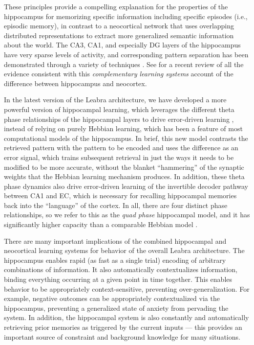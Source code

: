 \documentclass[11pt,twoside]{article}
\begin{document}
These principles provide a compelling explanation for the properties of the hippocampus for memorizing specific information including specific episodes (i.e., episodic memory), in contrast to a neocortical network that uses overlapping distributed representations to extract more generalized semantic information about the world.  The CA3, CA1, and especially DG layers of the hippocampus have very sparse levels of activity, and corresponding pattern separation has been demonstrated through a variety of techniques \cite{GilbertKesnerLee01,LeutgebLeutgebMoserEtAl07,McHughJonesQuinnEtAl07,BakkerKirwanMillerEtAl08}.  See  for a recent review of all the evidence consistent with this {\em complementary learning systems} account of the difference between hippocampus and neocortex.

In the latest version of the Leabra architecture, we have developed a more powerful version of hippocampal learning, which leverages the different theta phase relationships of the hippocampal layers to drive error-driven learning \cite{KetzEtAlInPrep}, instead of relying on purely Hebbian learning, which has been a feature of most computational models of the hippocampus.  In brief, this new model contrasts the retrieved pattern with the pattern to be encoded and uses the difference as an error signal, which trains subsequent retrieval in just the ways it needs to be modified to be more accurate, without the blanket ``hammering'' of the synaptic weights that the Hebbian learning mechanism produces.  In addition, these theta phase dynamics also drive error-driven learning of the invertible decoder pathway between CA1 and EC, which is necessary for recalling hippocampal memories back into the ``language'' of the cortex.  In all, there are four distinct phase relationships, so we refer to this as the {\em quad phase} hippocampal model, and it has significantly higher capacity than a comparable Hebbian model \cite{KetzEtAlInPrep}.

There are many important implications of the combined hippocampal and neocortical learning systems for behavior of the overall Leabra architecture.  The hippocampus enables rapid (as fast as a single trial) encoding of arbitrary combinations of information.  It also automatically contextualizes information, binding everything occurring at a given point in time together.  This enables behavior to be appropriately context-sensitive, preventing over-generalization.  For example, negative outcomes can be appropriately contextualized via the hippocampus, preventing a generalized state of anxiety from pervading the system.  
In addition, the hippocampal system is also constantly and automatically retrieving prior memories as triggered by the current inputs --- this provides an important source of constraint and background knowledge for many situations.
\end{document}
